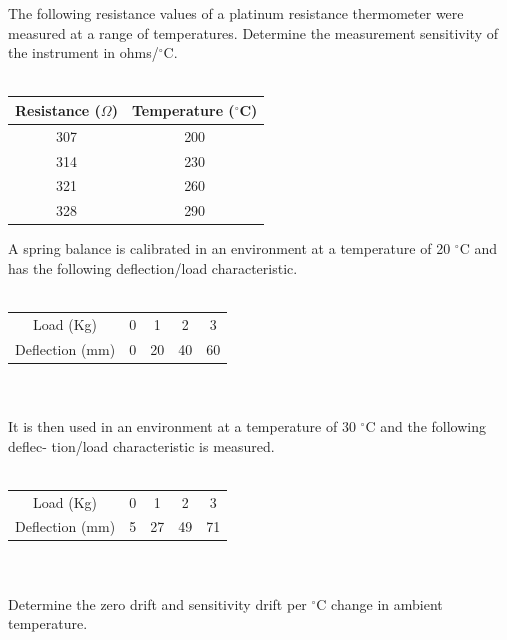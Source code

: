 \documentclass[a4paper,11pt,dvipsnames]{book}
\begin{document}
\begin{question}
The following resistance values of a platinum resistance thermometer were measured at a range
of temperatures.
 Determine the measurement sensitivity of the instrument in ohms/$^{\circ}$C. \\ \\
\begin{tabular}{cc}
\hline 
Resistance ($\Omega$) & Temperature ($^{\circ}$C) \\ 
\hline 
307 & 200 \\ 
314 & 230 \\ 
321 & 260 \\ 
328 & 290 \\ 
\end{tabular} 
\examspace*{5em}

\end{question}
\begin{solution}


\end{solution}


\begin{question}
A spring balance is calibrated in an environment at a temperature of 20 $^{\circ}$C and has the
following deflection/load characteristic. \\ \\

\begin{tabular}{ccccc}
\hline 
Load (Kg) & 0 & 1 & 2 & 3 \\ 
Deflection (mm) & 0 & 20 & 40 & 60 \\ 
\hline 
\end{tabular}  \\ \\

It is then used in an environment at a temperature of 30 $^{\circ}$C and the following deflec-
tion/load characteristic is measured. \\ \\

\begin{tabular}{ccccc}
\hline 
Load (Kg) & 0 & 1 & 2 & 3 \\ 
Deflection (mm) & 5 & 27 & 49 & 71 \\ 
\hline 
\end{tabular}  \\ \\


Determine the zero drift and sensitivity drift per $^{\circ}$C change in ambient temperature.


\examspace*{5em}

\end{question}
\begin{solution}


\end{solution}
\end{document}
